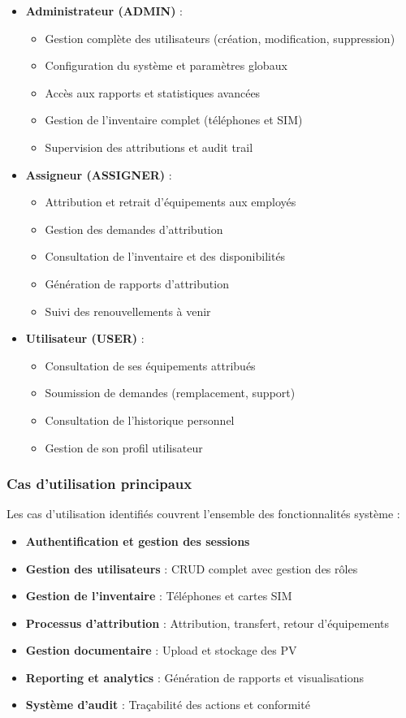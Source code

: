 \documentclass[12pt,a4paper]{report}
\begin{document}
\begin{itemize}
\item \textbf{Administrateur (ADMIN)} :
  \begin{itemize}
  \item Gestion complète des utilisateurs (création, modification, suppression)
  \item Configuration du système et paramètres globaux
  \item Accès aux rapports et statistiques avancées
  \item Gestion de l'inventaire complet (téléphones et SIM)
  \item Supervision des attributions et audit trail
  \end{itemize}

\item \textbf{Assigneur (ASSIGNER)} :
  \begin{itemize}
  \item Attribution et retrait d'équipements aux employés
  \item Gestion des demandes d'attribution
  \item Consultation de l'inventaire et des disponibilités
  \item Génération de rapports d'attribution
  \item Suivi des renouvellements à venir
  \end{itemize}

\item \textbf{Utilisateur (USER)} :
  \begin{itemize}
  \item Consultation de ses équipements attribués
  \item Soumission de demandes (remplacement, support)
  \item Consultation de l'historique personnel
  \item Gestion de son profil utilisateur
  \end{itemize}
\end{itemize}

\subsubsection{Cas d'utilisation principaux}
Les cas d'utilisation identifiés couvrent l'ensemble des fonctionnalités système :

\begin{itemize}
\item \textbf{Authentification et gestion des sessions}
\item \textbf{Gestion des utilisateurs} : CRUD complet avec gestion des rôles
\item \textbf{Gestion de l'inventaire} : Téléphones et cartes SIM
\item \textbf{Processus d'attribution} : Attribution, transfert, retour d'équipements
\item \textbf{Gestion documentaire} : Upload et stockage des PV
\item \textbf{Reporting et analytics} : Génération de rapports et visualisations
\item \textbf{Système d'audit} : Traçabilité des actions et conformité
\end{itemize}
\end{document}
